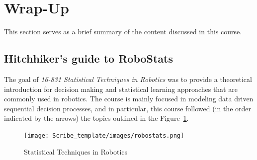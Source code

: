 \documentclass[11pt]{article}
\begin{document}
\section{Wrap-Up}

This section serves as a brief summary of the content discussed in this course. 

\subsection{Hitchhiker's guide to RoboStats}

The goal of \textit{16-831 Statistical Techniques in Robotics} was to provide a theoretical introduction for decision making and statistical learning approaches that are commonly used in robotics. The course is mainly focused in modeling data driven sequential decision processes, and in particular, this course followed (in the order indicated by the arrows) the topics outlined in the Figure~\ref{fig:robostats}.

\begin{figure}[H]
    \centering
    \texttt{[image: Scribe\_template/images/robostats.png]}
    \caption{Statistical Techniques in Robotics}
    \label{fig:robostats}
\end{figure}
\end{document}

